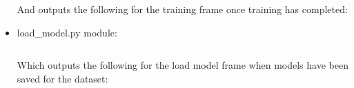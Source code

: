 \documentclass[./project-report/src/latex/project-report.tex]{subfiles}
\begin{document}
\begin{itemize}
        \pagebreak

        And outputs the following for the training frame once training has completed:

        \begin{figure}[h!]
        \centering
        \end{figure}

    \item load\_model.py module:
        \label{sec:load_model-module}
        \inputminted{python}{./school_project/frames/load_model.py}

        Which outputs the following for the load model frame when models have been saved for the dataset:

        \pagebreak

        \begin{figure}[h!]
        \centering
        \end{figure}


\end{itemize}
\end{document}
